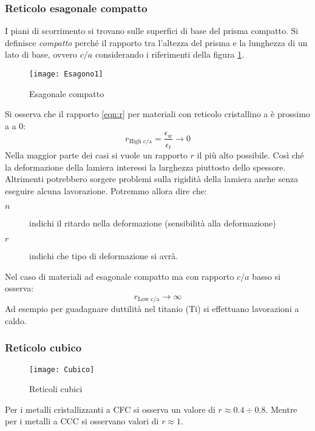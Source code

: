 \subsubsection{Reticolo esagonale compatto}
I piani di scorrimento si trovano sulle superfici di base del prisma compatto.
Si definisce \textit{compatto} perché il rapporto tra l'altezza del prisma e la lunghezza di un lato di base, ovvero $c/a$ considerando i riferimenti della figura \ref{fig:EsaComp}.
\begin{figure}
\centering
\texttt{[image: Esagono1]}
\caption{Esagonale compatto}
\label{fig:EsaComp}
\end{figure}
Si osserva che il rapporto \ref{eqn:r} per materiali con reticolo cristallino a è prossimo a a 0:
\begin{equation}
r_{\text{High c/a}} = \frac{\epsilon_w}{\epsilon_t} \longrightarrow 0
\label{eqn:HighC_AR}
\end{equation}
Nella maggior parte dei casi si vuole un rapporto $r$ il più alto possibile. Così ché la deformazione della lamiera interessi la larghezza piuttosto dello spessore. Altrimenti potrebbero sorgere problemi sulla rigidità della lamiera anche senza eseguire alcuna lavorazione.
Potremmo allora dire che:
\begin{description}
\item[$n$] indichi il ritardo nella deformazione (sensibilità alla deformazione)
\item[$r$] indichi che tipo di deformazione si avrà. 
\end{description} 

Nel caso di materiali ad esagonale compatto ma con rapporto $c/a$ basso si osserva:
\begin{equation}
r_{\text{Low c/a}} \longrightarrow \infty 
\end{equation}
Ad esempio per guadagnare duttilità nel titanio (Ti) si effettuano lavorazioni a caldo.

\subsubsection{Reticolo cubico}
\begin{figure}
\centering
\texttt{[image: Cubico]}
\caption{Reticoli cubici}
\label{fig:Cubici}
\end{figure}
Per i metalli cristallizzanti a \ac{CFC} si osserva un valore di $r\approx 0.4 \div 0.8$.
Mentre per i metalli a \ac{CCC} si osservano valori di $r \approx 1$.

